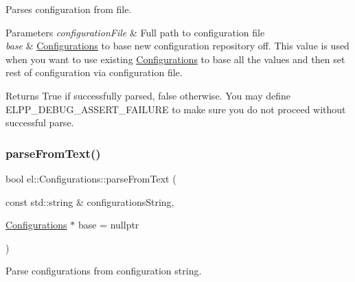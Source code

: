 Parses configuration from file. 


\begin{DoxyParams}{Parameters}
{\em configuration\+File} & Full path to configuration file \\
\hline
{\em base} & \hyperlink{classel_1_1_configurations}{Configurations} to base new configuration repository off. This value is used when you want to use existing \hyperlink{classel_1_1_configurations}{Configurations} to base all the values and then set rest of configuration via configuration file. \\
\hline
\end{DoxyParams}
\begin{DoxyReturn}{Returns}
True if successfully parsed, false otherwise. You may define \textquotesingle{}E\+L\+P\+P\+\_\+\+D\+E\+B\+U\+G\+\_\+\+A\+S\+S\+E\+R\+T\+\_\+\+F\+A\+I\+L\+U\+RE\textquotesingle{} to make sure you do not proceed without successful parse. 
\end{DoxyReturn}
\mbox{\label{classel_1_1_configurations_af262a41dff665a11889261137b62af4a}} 
\subsubsection{\texorpdfstring{parse\+From\+Text()}{parseFromText()}}
{\footnotesize\ttfamily bool el\+::\+Configurations\+::parse\+From\+Text (\begin{DoxyParamCaption}\item[{const std\+::string \&}]{configurations\+String,  }\item[{\hyperlink{classel_1_1_configurations}{Configurations} $\ast$}]{base = {\ttfamily nullptr} }\end{DoxyParamCaption})\hspace{0.3cm}{\ttfamily [inline]}}



Parse configurations from configuration string. 

